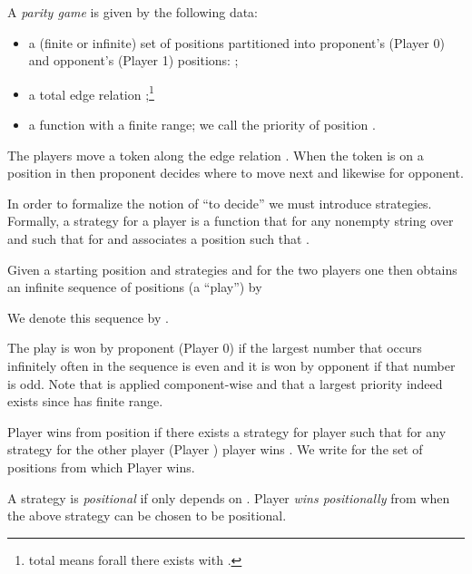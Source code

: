 
\newcommand{\Pos}{\mathit{Pos}}

A \emph{parity game} is given by the following data:
  \begin{itemize}
  \item a (finite or infinite) set of positions 
           partitioned into proponent's (Player 0) and opponent's (Player 1) positions:
           \@;
   \item a total edge relation \@;\footnote{ 
             total means forall  there exists  with  \@.}
    \item a function  with a finite range; 
            we call  the priority of position \@. 
  \end{itemize}
The players move a token along the edge relation \@. When the
token is on a position in  then proponent decides where to move
next and likewise for opponent.

In order to formalize the notion of ``to decide'' we must introduce
strategies.  Formally, a strategy for a player  is a
function  that for any nonempty string  over  and such that 
for  and  associates a position
 such that \@.

Given a starting position  and strategies  and  for
the two players one then obtains an infinite sequence of positions (a
``play'')   by 

We denote this sequence by \@.  

The play is won by proponent (Player 0) if the largest number that
occurs infinitely often in the sequence 
is even and it is won by opponent if that number is odd. Note that
 is applied component-wise and that a largest priority indeed
exists since  has finite range.

Player  wins from position  if there exists a strategy  for
player  such that for any strategy  for the other player
(Player ) player  wins \@.  
We write  for the set of positions from which Player  wins.

A strategy  is \emph{positional} if  only
depends on \@.  Player  \emph{wins positionally} from 
when the above strategy  can be chosen to be positional.

